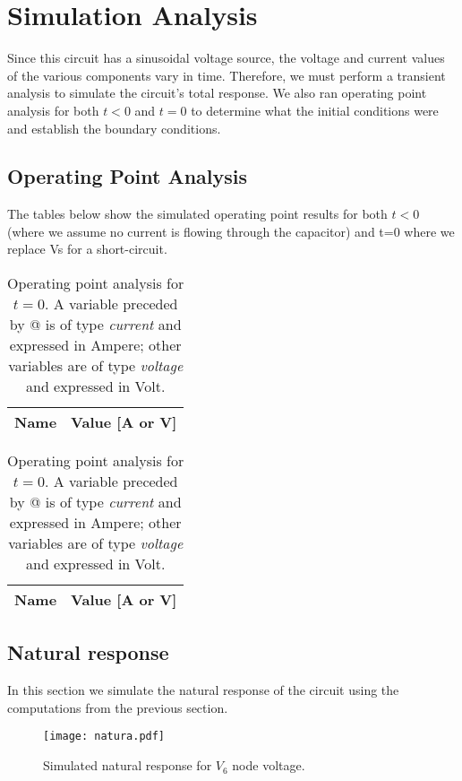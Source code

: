 \newpage
\section{Simulation Analysis}
\label{sec:simulation}
Since this circuit has a sinusoidal voltage source, the voltage and current values of the various components vary in time. Therefore, we must perform a transient analysis to simulate the circuit's total response. We also ran operating point analysis for both $t<0$ and $t=0$ to determine what the initial conditions were and establish the boundary conditions.
\subsection{Operating Point Analysis}
The tables below show the simulated operating point results for both $t<0$ (where we assume no current is flowing through the capacitor) and t=0 where we replace Vs for a short-circuit.
\begin{table}[!htb]
	\begin{minipage}{.5\linewidth}
	\centering
	\begin{tabular}{ll}
	{\bf Name} & {\bf Value [A or V]} \\ \hline
	
	\end{tabular}
	\caption{Operating point analysis for $t<0$. A variable preceded by @ is of type {\em current} other variables are of type {\it voltage} and expressed in Volt.}
  	\end{minipage}
  	\hfill
	\begin{minipage}{.5\linewidth}
	\centering
  	\begin{tabular}{ll}
   	{\bf Name} & {\bf Value [A or V]} \\ \hline
   	
	\end{tabular}
	\caption{Operating point analysis for $t=0$. A variable preceded by @ is of type {\em current} and expressed in Ampere; other variables are of type {\it voltage} and expressed in Volt.}
	\end{minipage}
\end{table}
\subsection{Natural response}
In this section we simulate the natural response of the circuit using the computations from the previous section.
\begin{figure}[!h] \centering
\texttt{[image: natura.pdf]}
\caption{Simulated natural response for $V_{6}$ node voltage.}
\label{fig:natura}
\end{figure}
\newpage
